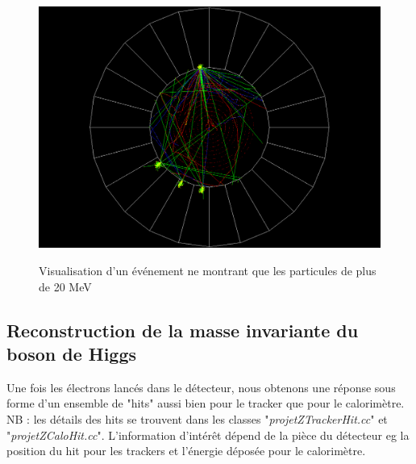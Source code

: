\documentclass[11pt]{article}
\begin{document}
\begin{figure}
\caption{Visualisation d'un événement ne montrant que les particules de plus
de 20 MeV}
\includegraphics[scale=0.40]{images/evenPlus20MeV3.png}
\label{viz2}
\end{figure}

\newpage
\subsection{Reconstruction de la masse invariante du boson de Higgs}

Une fois les électrons lancés dans le détecteur, nous obtenons une réponse sous
forme d'un ensemble de "hits" aussi bien pour le tracker que pour le
calorimètre. NB : les détails des hits se trouvent dans les classes
"\textit{projetZTrackerHit.cc}" et "\textit{projetZCaloHit.cc}". L'information
d'intérêt dépend de la pièce du détecteur eg la position du hit pour les
trackers et l'énergie déposée pour le calorimètre. 
\end{document}

